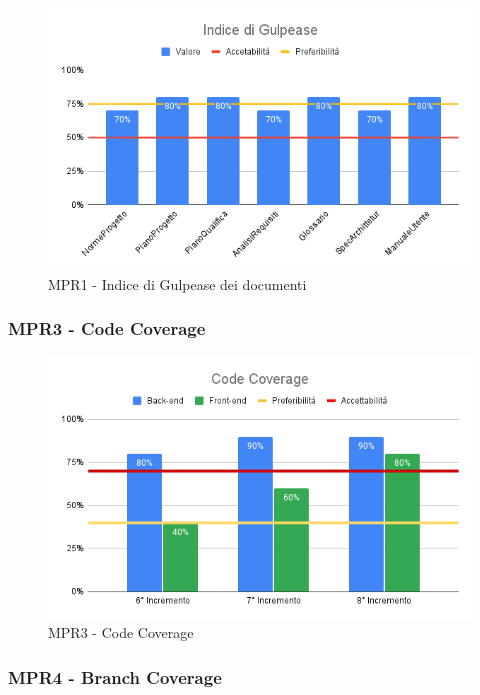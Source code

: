 \begin{figure}[H]
	\centering
	\includegraphics[scale = 0.6]{sezioni/Images/CA/GG.png}
	\caption{MPR1 - Indice di Gulpease dei documenti}
\end{figure}

\subsubsection{MPR3 - Code Coverage}

\begin{figure}[H]
	\centering
	\includegraphics[scale = 0.6]{sezioni/Images/CA/CC.png}
	\caption{MPR3 - Code Coverage}
\end{figure}

\subsubsection{MPR4 - Branch Coverage}

